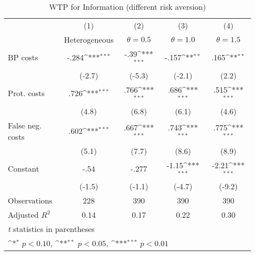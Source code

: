 \begin{table}[htbp]\centering
\def\sym#1{\ifmmode^{#1}\else\(^{#1}\)\fi}
\caption{WTP for Information (different risk aversion)}
\begin{tabular}{l*{4}{c}}
\hline\hline
                &\multicolumn{1}{c}{(1)}&\multicolumn{1}{c}{(2)}&\multicolumn{1}{c}{(3)}&\multicolumn{1}{c}{(4)}\\
                &\multicolumn{1}{c}{Heterogeneous}&\multicolumn{1}{c}{$\theta=0.5$}&\multicolumn{1}{c}{$\theta=1.0$}&\multicolumn{1}{c}{$\theta=1.5$}\\
\hline
BP costs        &    -.284\sym{***}&     -.39\sym{***}&    -.157\sym{**} &     .165\sym{**} \\
                &   (-2.7)         &   (-5.3)         &   (-2.1)         &    (2.2)         \\
Prot. costs     &     .726\sym{***}&     .766\sym{***}&     .686\sym{***}&     .515\sym{***}\\
                &    (4.8)         &    (6.8)         &    (6.1)         &    (4.6)         \\
False neg. costs&     .602\sym{***}&     .667\sym{***}&     .743\sym{***}&     .775\sym{***}\\
                &    (5.1)         &    (7.7)         &    (8.6)         &    (8.9)         \\
Constant        &     -.54         &    -.277         &    -1.15\sym{***}&    -2.21\sym{***}\\
                &   (-1.5)         &   (-1.1)         &   (-4.7)         &   (-9.2)         \\
\hline
Observations    &      228         &      390         &      390         &      390         \\
Adjusted \(R^{2}\)&     0.14         &     0.17         &     0.22         &     0.30         \\
\hline\hline
\multicolumn{5}{l}{\footnotesize \textit{t} statistics in parentheses}\\
\multicolumn{5}{l}{\footnotesize \sym{*} \(p<0.10\), \sym{**} \(p<0.05\), \sym{***} \(p<0.01\)}\\
\end{tabular}
\end{table}
